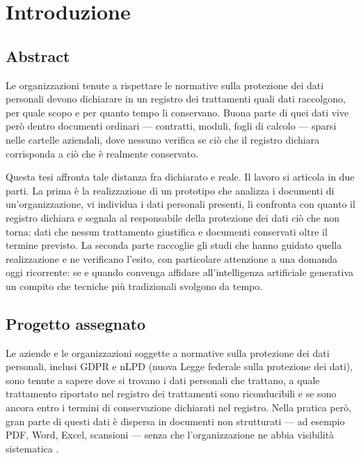 \chapter{Introduzione}
\label{cap:introduzione}

\section{Abstract}
\label{sec:riassunto-abstract}

Le organizzazioni tenute a rispettare le normative sulla protezione dei dati personali devono dichiarare in un registro dei trattamenti quali dati raccolgono, per quale scopo e per quanto tempo li conservano. Buona parte di quei dati vive però dentro documenti ordinari --- contratti, moduli, fogli di calcolo --- sparsi nelle cartelle aziendali, dove nessuno verifica se ciò che il registro dichiara corrisponda a ciò che è realmente conservato.

Questa tesi affronta tale distanza fra dichiarato e reale. Il lavoro si articola in due parti. La prima è la realizzazione di un prototipo che analizza i documenti di un'organizzazione, vi individua i dati personali presenti, li confronta con quanto il registro dichiara e segnala al responsabile della protezione dei dati ciò che non torna: dati che nessun trattamento giustifica e documenti conservati oltre il termine previsto. La seconda parte raccoglie gli studi che hanno guidato quella realizzazione e ne verificano l'esito, con particolare attenzione a una domanda oggi ricorrente: se e quando convenga affidare all'intelligenza artificiale generativa un compito che tecniche più tradizionali svolgono da tempo.


\section{Progetto assegnato}
\label{sec:progetto-assegnato}

Le aziende e le organizzazioni soggette a normative sulla protezione dei dati personali, inclusi GDPR e nLPD (nuova Legge federale sulla protezione dei dati), sono tenute a sapere dove si trovano i dati personali che trattano, a quale trattamento riportato nel registro dei trattamenti sono riconducibili e se sono ancora entro i termini di conservazione dichiarati nel registro. Nella pratica però, gran parte di questi dati è dispersa in documenti non strutturati — ad esempio PDF, Word, Excel, scansioni — senza che l'organizzazione ne abbia visibilità sistematica \cite{gandomiHypeBigData2015}.

